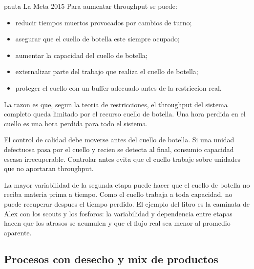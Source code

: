\begin{pautacompleta}{pauta La Meta 2015}
Para aumentar throughput se puede:
\begin{itemize}
  \item reducir tiempos muertos provocados por cambios de turno;
  \item asegurar que el cuello de botella este siempre ocupado;
  \item aumentar la capacidad del cuello de botella;
  \item externalizar parte del trabajo que realiza el cuello de botella;
  \item proteger el cuello con un buffer adecuado antes de la restriccion real.
\end{itemize}
La razon es que, segun la teoria de restricciones, el throughput del sistema completo queda limitado por el recurso cuello de botella. Una hora perdida en el cuello es una hora perdida para todo el sistema.

El control de calidad debe moverse antes del cuello de botella. Si una unidad defectuosa pasa por el cuello y recien se detecta al final, consumio capacidad escasa irrecuperable. Controlar antes evita que el cuello trabaje sobre unidades que no aportaran throughput.

La mayor variabilidad de la segunda etapa puede hacer que el cuello de botella no reciba materia prima a tiempo. Como el cuello trabaja a toda capacidad, no puede recuperar despues el tiempo perdido. El ejemplo del libro es la caminata de Alex con los scouts y los fosforos: la variabilidad y dependencia entre etapas hacen que los atrasos se acumulen y que el flujo real sea menor al promedio aparente.
\end{pautacompleta}

\subsection{Procesos con desecho y mix de productos}

